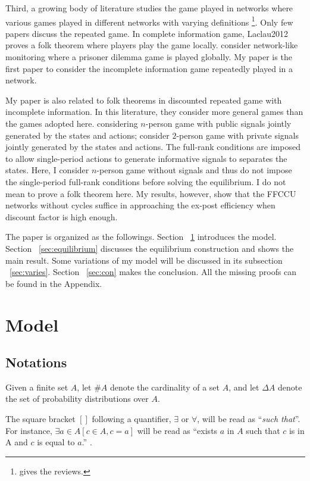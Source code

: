 \documentclass[12pt,letterpaper]{article}
\theoremstyle{definition}
\theoremstyle{remark}
\theoremstyle{claim}
\begin{document}
Third, a growing body of literature studies the game played in networks where various games played in different networks with varying definitions \footnote{\citep{Jackson2008}\citep{Goyal2012} gives the reviews.}. Only few papers discuss the repeated game. In complete information game, Laclau2012 proves a folk theorem where players play the game locally. \citep{Wolitzky2013} \citep{Wolitzky2014} consider network-like monitoring where a prisoner dilemma game is played globally. My paper is the first paper to consider the incomplete information game repeatedly played in a network. 


My paper is also related to folk theorems in discounted repeated game with incomplete information. In this literature, they consider more general games than the games adopted here. \citep{Fudenberg2010} \citep{Fudenberg2011} \citep{Wiseman2012}  considering $n$-person game with public signals jointly generated by the states and actions; \citep{Yamamoto2014} consider $2$-person game with private signals jointly generated by the states and actions. The full-rank conditions are imposed to allow single-period actions to generate informative signals to separates the states. Here, I consider $n$-person game without signals and thus do not impose the single-period full-rank conditions before solving the equilibrium. I do not mean to prove a folk theorem here. My results, however, show that the FFCCU networks without cycles suffice in approaching the ex-post efficiency when discount factor is high enough.


The paper is organized as the followings. Section ~\ref{sec:model} introduces the model. Section ~\ref{sec:equilibrium} discusses the equilibrium construction and shows the main result. Some variations of my model will be discussed in its subsection ~\ref{sec:varies}. Section ~\ref{sec:con} makes the conclusion. All the missing proofs can be found in the Appendix.

\section{Model}
\label{sec:model}
\subsection{Notations}
Given a finite set $A$, let $\#A$ denote the cardinality of a set $A$, and let $\Delta A$ denote the set of probability distributions over $A$. 

The square bracket $[]$ following a quantifier, $\exists$ or $\forall$, will be read as ``\textit{such that}''. For instance, $\exists a \in A [c\in A, c=a]$ will be read as ``exists $a$ in $A$ such that $c$ is in A and $c$ is equal to $a$.'' .
\end{document}
